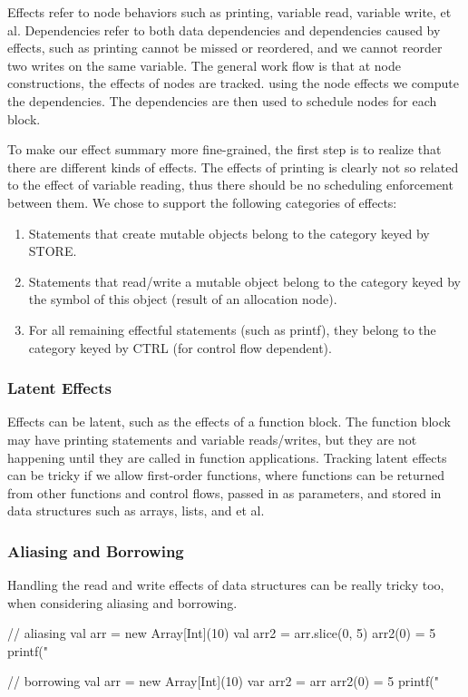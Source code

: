 Effects refer to node behaviors such as printing, variable read, variable write, et al.
Dependencies refer to both data dependencies and dependencies caused by effects, such as
printing cannot be missed or reordered, and we cannot reorder two writes on the same variable.
The general work flow is that at node constructions, the effects of nodes are tracked. using
the node effects we compute the dependencies. The dependencies are then used to schedule nodes
for each block.

To make our effect summary more fine-grained, the first step is to realize that there are different
kinds of effects. The effects of printing is clearly not so related to the effect of variable reading,
thus there should be no scheduling enforcement between them. We chose to support the following categories
of effects:

\begin{enumerate}
\item Statements that create mutable objects belong to the category keyed by STORE.
\item Statements that read/write a mutable object belong to the category keyed by the symbol of this object
      (result of an allocation node).
\item For all remaining effectful statements (such as printf), they belong to the category keyed by CTRL
     (for control flow dependent).
\end{enumerate}

\subsubsection{Latent Effects}
Effects can be latent, such as the effects of a function block. The function block may have printing
statements and variable reads/writes, but they are not happening until they are called in function
applications. Tracking latent effects can be tricky if we allow first-order functions, where functions
can be returned from other functions and control flows, passed in as parameters, and stored in data
structures such as arrays, lists, and et al.

\subsubsection{Aliasing and Borrowing}
Handling the read and write effects of data structures can be really tricky too, when considering
aliasing and borrowing.

\begin{listing}[scala]
// aliasing
val arr = new Array[Int](10)
val arr2 = arr.slice(0, 5)
arr2(0) = 5
printf("%

// borrowing
val arr = new Array[Int](10)
var arr2 = arr
arr2(0) = 5
printf("%
\end{listing}

